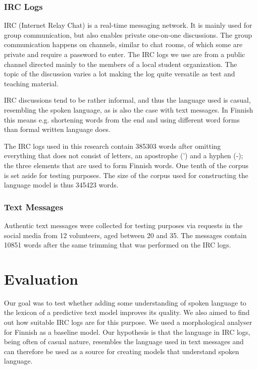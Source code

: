 \documentclass[a4paper,conference]{IEEEtran}
\begin{document}
\subsubsection{IRC Logs}
IRC (Internet Relay Chat) is a real-time messaging network. It is mainly used for group communication, but also enables private one-on-one discussions. The group communication happens on channels, similar to chat rooms, of which some are private and require a password to enter. The IRC logs we use are from a public channel directed mainly to the members of a local student organization. The topic of the discussion varies a lot making the log quite versatile as test and teaching material.

IRC discussions tend to be rather informal, and thus the language used is casual, resembling the spoken language, as is also the case with text messages. In Finnish this  means e.g. shortening words from the end and using different word forms than formal written language does.

The IRC logs used in this research contain 385303 words after omitting everything that does not consist of letters, an apostrophe (') and a hyphen (-); the three elements that are used to form Finnish words. One tenth of the corpus is set aside for testing purposes. The size of the corpus used for constructing the language model is thus 345423 words.


\subsubsection{Text Messages}

Authentic text messages were collected for testing purposes via requests in the social media from 12 volunteers, aged between 20 and 35. The messages contain 10851 words after the same trimming that was performed on the IRC logs.

\section{Evaluation}
\label{sec:evaluation}

Our goal was to test whether adding some understanding of spoken language to the lexicon of a predictive text model improves its quality. We also aimed to find out how suitable IRC logs are for this purpose. We used a morphological analyser for Finnish as a baseline model. Our hypothesis is that the language in IRC logs, being often of casual nature, resembles the language used in text messages and can therefore be used as a source for creating models that understand spoken language.
\end{document}

